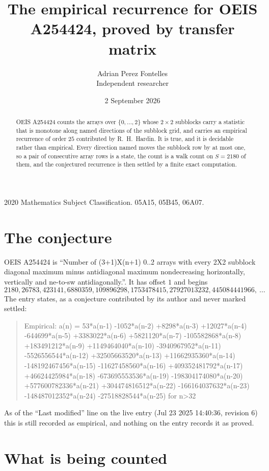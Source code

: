\documentclass[11pt,a4paper]{article}
\title{The empirical recurrence for OEIS A254424, proved by transfer matrix}
\author{Adrian Perez Fontelles\\ \small Independent researcher}
\date{2 September 2026}
\theoremstyle{plain}
\theoremstyle{definition}
\begin{document}
\maketitle

\begin{abstract}
OEIS A254424 counts the arrays over $\{0,\dots,2\}$ whose $2\times2$ subblocks carry a
statistic that is monotone along named directions of the subblock grid, and carries an
empirical recurrence of order $25$ contributed by R.~H.~Hardin. It is true, and it is
decidable rather than empirical. Every direction named moves the subblock row by at most one,
so a pair of consecutive array rows is a state, the count is a walk count on $S=2180$ of them,
and the conjectured recurrence is then settled by a finite exact computation.
\end{abstract}

\noindent\small 2020 Mathematics Subject Classification. 05A15, 05B45, 06A07.\normalsize

\section{The conjecture}

OEIS A254424 is ``Number of (3+1)X(n+1) 0..2 arrays with every 2X2 subblock diagonal maximum minus antidiagonal maximum nondecreasing horizontally, vertically and ne-to-sw antidiagonally.''. It has offset $1$ and begins
\[
2180, 26783, 423141, 6880359, 109896298, 1753478415, 27927013232, 445084441966,\ \dots
\]
The entry states, as a conjecture contributed by its author and never marked settled:
\begin{quote}
Empirical: a(n) = 53*a(n-1) -1052*a(n-2) +8298*a(n-3) +12027*a(n-4) -644699*a(n-5) +3383022*a(n-6) +5821120*a(n-7) -105582868*a(n-8) +183491212*a(n-9) +1149464040*a(n-10) -3940967952*a(n-11) -5526556544*a(n-12) +32505663520*a(n-13) +11662935360*a(n-14) -148192467456*a(n-15) -11627458560*a(n-16) +409352481792*a(n-17) +46624425984*a(n-18) -673695553536*a(n-19) -198304174080*a(n-20) +577600782336*a(n-21) +304474816512*a(n-22) -166164037632*a(n-23) -148487012352*a(n-24) -27518828544*a(n-25) for n>32
\end{quote}
As of the ``Last modified'' line on the live entry (Jul 23 2025 14:40:36, revision 6) this is still
recorded as empirical, and nothing on the entry records it as proved.

\section{What is being counted}
\end{document}
